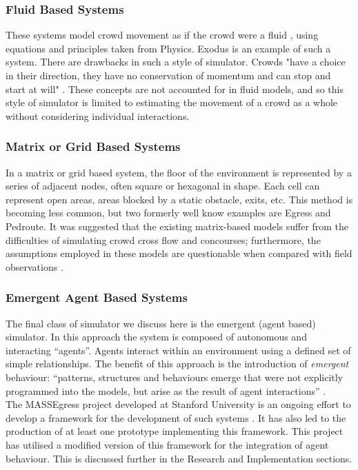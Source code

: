 \subsubsection{Fluid Based Systems}
These systems model crowd movement as if the crowd were a fluid \cite{WikipediaFluidMechanics}, using equations and principles taken from Physics. 
Exodus \cite{GaleaNumericalSimulation,GaleaMathModelling} is an example of such a system. There are drawbacks in such a style 
of simulator. Crowds "have a choice in their direction, they have no conservation of momentum and can stop and start at will" \cite{StillCrowdDynamics}. 
These concepts are not accounted for in fluid models, and so this style of simulator is limited to estimating the movement of a crowd as a whole without
considering individual interactions.

\subsubsection{Matrix or Grid Based Systems}
In a matrix or grid based system, the floor of the environment is represented by a series of adjacent nodes, often square or hexagonal in shape. Each 
cell can represent open areas, areas blocked by a static obstacle, exits, etc. This method is becoming less common, but two formerly well know examples are 
Egress and Pedroute. It was suggested that the existing matrix-based models suffer from the
difficulties of simulating crowd cross flow and concourses; furthermore, the
assumptions employed in these models are questionable when compared with field observations \cite{StillCrowdDynamics}.

\subsubsection{Emergent Agent Based Systems}
The final class of simulator we discuss here is the emergent (agent based) simulator. In this approach the system is composed of autonomous
and interacting ``agents''. Agents interact within an environment using a defined set of simple relationships. The benefit of this approach is the introduction
of \emph{emergent} behaviour: ``patterns, structures and behaviours emerge that were not explicitly programmed into the models, but arise as the 
result of agent interactions'' \cite{AgentBasedTutorial}.\\
The MASSEgress project developed at Stanford University is an ongoing effort to develop a framework for the development of such systems \cite{MultiAgentFramework}.
It has also led to the production of at least one prototype implementing this framework. 
This project has utilised a modified version of this framework for the integration
of agent behaviour. This is discussed further in the Research and Implementation sections.

